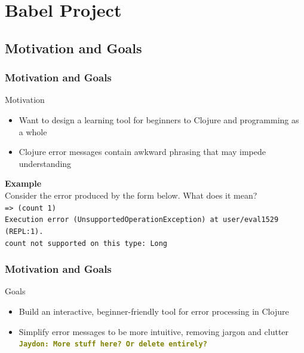 \documentclass{beamer}
\newcommand{\comment}[1]{{\bf \tt  {#1}}}
\newcommand{\jscomment}[1]{\textcolor{olive}{\comment{Jaydon: {#1}}}}
\begin{document}
\section{Babel Project}
\subsection{Motivation and Goals}

\begin{frame}
    \frametitle{Motivation and Goals}
    Motivation
    \begin{itemize}
        \item Want to design a learning tool for beginners to Clojure and programming as a whole
        \item Clojure error messages contain awkward phrasing that may impede understanding
    \end{itemize}
    \textbf{Example} \\
    Consider the error produced by the form below. What does it mean? \\
    \texttt{=> (count 1)} \\
    \texttt{Execution error (UnsupportedOperationException) at user/eval1529 (REPL:1).} \\
    \texttt{count not supported on this type: Long} \\
\end{frame}

\begin{frame}
    \frametitle{Motivation and Goals}
    Goals
    \begin{itemize}
        \item Build an interactive, beginner-friendly tool for error processing in Clojure
        \item Simplify error messages to be more intuitive, removing jargon and clutter \\
        \jscomment{More stuff here? Or delete entirely?}
    \end{itemize}
\end{frame}
\end{document}
